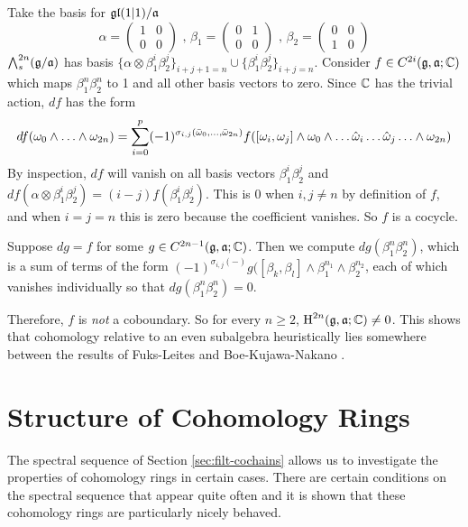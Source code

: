   Take the basis for $\mathfrak{gl}(1|1)/\mathfrak{a}$
  \[
    \alpha = \begin{pmatrix} 1 & 0 \\ 0 & 0\end{pmatrix}\text{ , } \beta_1 = \begin{pmatrix}0 & 1 \\ 0 & 0\end{pmatrix} \text{ , } \beta_2 = \begin{pmatrix}0 & 0 \\ 1 & 0\end{pmatrix}
  \]
  $\bigwedge\nolimits^{2n}_s(\mathfrak{g}/\mathfrak{a})$ has basis $\{\alpha \otimes \beta_1^i \beta_2^j\}_{i + j + 1 = n} \cup \{\beta_1^i \beta_2^j\}_{i+j = n}$. Consider $f \in C^{2i}(\mathfrak{g},\mathfrak{a};\mathbb{C})$ which maps $\beta_1^n \beta_2^n$ to 1 and all other basis vectors to zero. Since $\mathbb{C}$ has the trivial action, $df$ has the form
  \[
    df(\omega_0 \wedge \ldots \wedge \omega_{2n}) = \sum_{i = 0}^p (-1)^{\sigma_{i,j}(\bar {\omega}_0,\ldots,\bar{\omega}_{2n})} f([\omega_i,\omega_j] \wedge \omega_0 \wedge \ldots \hat {\omega}_i \ldots \hat {\omega}_j \ldots \wedge \omega_{2n})
  \]
  By inspection, $df$ will vanish on all basis vectors $\beta_1^i \beta_2^j$ and $df(\alpha \otimes \beta_1^i \beta_2^j) = (i-j) f(\beta_1^i \beta_2^j)$. This is $0$ when $i,j \neq n$ by definition of $f$, and when $i = j = n$ this is zero because the coefficient vanishes. So $f$ is a cocycle.

  Suppose $dg = f$ for some $g \in C^{2n-1}(\mathfrak{g},\mathfrak{a};\mathbb{C})$. Then we compute $dg(\beta_1^n \beta_2^n)$, which is a sum of terms of the form $(-1)^{\sigma_{i,j}(-)} g([\beta_k, \beta_l] \wedge \beta_1^{n_1} \wedge \beta_2^{n_2}$, each of which vanishes individually so that $dg(\beta_1^n \beta_2^n) = 0$.

  Therefore, $f$ is \emph{not} a coboundary. So for every $n \geq 2$, $\operatorname{H}^{2n}(\mathfrak{g},\mathfrak{a};\mathbb{C}) \neq 0$. This shows that cohomology relative to an even subalgebra heuristically lies somewhere between the results of Fuks-Leites \cite{fuks-leites} and Boe-Kujawa-Nakano \cite{BKN-1}.

\section{Structure of Cohomology Rings}
\label{sec:structure}

The spectral sequence of Section \ref{sec:filt-cochains} allows us to investigate the properties of cohomology rings in certain cases. There are certain conditions on the spectral sequence that appear quite often and it is shown that these cohomology rings are particularly nicely behaved.

